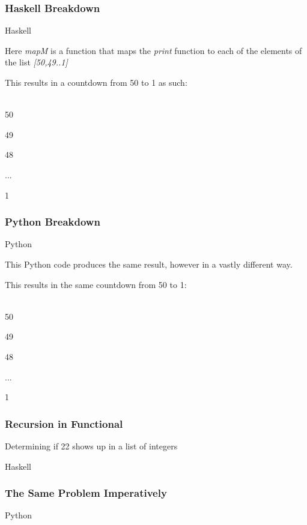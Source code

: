 \documentclass{beamer}
\begin{document}
\begin{frame}
  \frametitle{Haskell Breakdown}
  \begin{block}{Haskell}
    
  \end{block}

  Here \textit{mapM\textunderscore} is a function that maps the \textit{print} function to each of the elements of the list \textit{[50,49..1]}

  This results in a countdown from 50 to 1 as such:
  \begin{texttt}\\
  50

  49

  48

  ...

  1
  \end{texttt}
\end{frame}

\begin{frame}
  \frametitle{Python Breakdown}
  \begin{block}{Python}
    
  \end{block}

  This Python code produces the same result, however in a vastly different way.

  This results in the same countdown from 50 to 1:
  \begin{texttt}\\
  50

  49

  48

  ...

  1
  \end{texttt}
\end{frame}

\begin{frame}
  \frametitle{Recursion in Functional}
  Determining if 22 shows up in a list of integers
  \begin{block}{Haskell}
    
  \end{block}
\end{frame}

\begin{frame}
  \frametitle{The Same Problem Imperatively}
  \begin{block}{Python}
    
  \end{block}
\end{frame}
\end{document}
